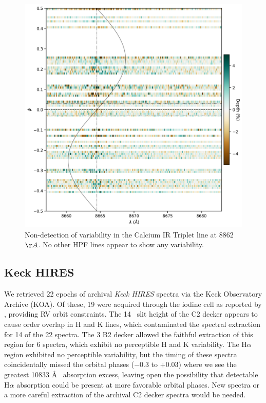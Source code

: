 \documentclass[twocolumn]{aastex631}
\begin{document}
\begin{figure}
    \includegraphics[width=\linewidth]{figures/Ca8662_phase_2D_diagram_resid.png}
    \caption{Non-detection of variability in the Calcium IR Triplet line at 8862 $\AA$.  No other HPF lines appear to show any variability.}
    \label{fig:CaPhaseScan}
\end{figure}

\subsection{Keck HIRES}
We retrieved 22 epochs of archival \emph{Keck HIRES} spectra via the Keck Observatory Archive (KOA). Of these, 19 were acquired through the iodine cell as reported by \citet{2017AJ....153..211Z}, providing RV orbit constraints.  The 14\arcsec~ slit height of the C2 decker appears to cause order overlap in  H and K lines, which contaminated the spectral extraction for 14 of the 22 spectra.  The 3 B2 decker allowed the faithful extraction of this region for 6 spectra, which exhibit no perceptible  H and K variability.  The H$\alpha$ region exhibited no perceptible variability, but the timing of these spectra coincidentally missed the orbital phases ($-0.3$ to $+0.03$) where we see the greatest  10833 \AA~ absorption excess, leaving open the possibility that detectable H$\alpha$ absorption could be present at more favorable orbital phases.  New spectra or a more careful extraction of the archival C2 decker spectra would be needed.
\end{document}
